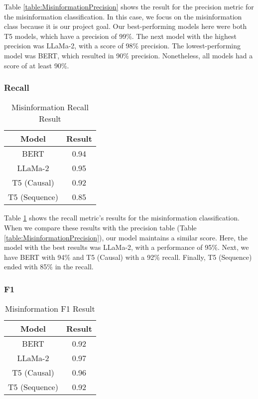 Table \ref{table:MisinformationPrecision} shows the result for the precision metric for the misinformation classification. In this case, we focus on the misinformation
class because it is our project goal. Our best-performing models here were both T5 models, which have a precision of 99\%. The next model with the highest precision
was LLaMa-2, with a score of 98\% precision. The lowest-performing model was BERT, which resulted in 90\% precision. Nonetheless, all models had a score of at least 90\%.

\subsubsection{Recall}
\begin{table}[H]
	\centering
	\caption{Misinformation Recall Result}
	\begin{tabular}{||c | c||} 
		\hline
		\textbf{Model} & \textbf{Result} \\ [0.5ex] 
		\hline
		BERT & 0.94  \\
		\hline
		LLaMa-2 & 0.95 \\ 
		\hline
		T5 (Causal) & 0.92 \\
		\hline
		T5 (Sequence) & 0.85 \\
		\hline
	\end{tabular}
	\label{table:MisinformationRecall}
\end{table}

Table \ref{table:MisinformationRecall} shows the recall metric's results for the misinformation classification. When we compare these results with the precision table 
(Table \ref{table:MisinformationPrecision}), our model maintains a similar score. Here, the model with the best results was LLaMa-2, with a performance of 95\%.
Next, we have BERT with 94\% and T5 (Causal) with a 92\% recall. Finally, T5 (Sequence) ended with 85\% in the recall.

\subsubsection{F1}
\begin{table}[H]
	\centering
	\caption{Misinformation F1 Result}
	\begin{tabular}{||c | c||} 
		\hline
		\textbf{Model} & \textbf{Result} \\ [0.5ex] 
		\hline
		BERT & 0.92  \\
		\hline
		LLaMa-2 & 0.97 \\ 
		\hline
		T5 (Causal) & 0.96 \\
		\hline
		T5 (Sequence) & 0.92 \\
		\hline
	\end{tabular}
	\label{table:MisinformationF1}
\end{table}

